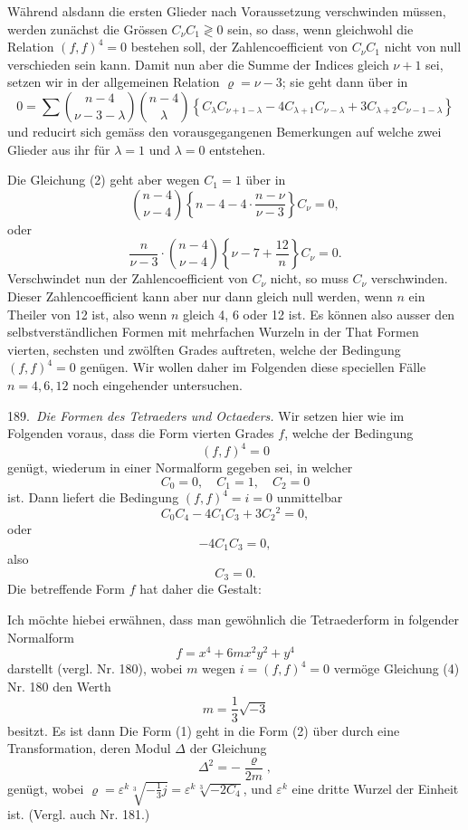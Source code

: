 Während alsdann die ersten Glieder nach Voraussetzung verschwinden
müssen, werden zunächst die Grössen $C_\nu C_1 \gtrless 0$ sein, so dass, wenn
gleichwohl die Relation $(f,f)^4=0$ bestehen soll, der Zahlencoefficient
von $C_\nu C_1$ nicht von null verschieden sein kann. Damit nun aber die
Summe der Indices gleich $\nu+1$ sei, setzen wir in der allgemeinen
Relation $\varrho=\nu-3$; sie geht dann über in
\[
0=\sum\binom{n-4}{\nu-3-\lambda}\binom{n-4}{\lambda}\left\{C_\lambda C_{\nu+1-\lambda}-4C_{\lambda+1}C_{\nu-\lambda}+3C_{\lambda+2}C_{\nu-1-\lambda}\right\}
\]
und reducirt sich gemäss den vorausgegangenen Bemerkungen auf
welche zwei Glieder aus ihr für $\lambda=1$ und $\lambda=0$ entstehen.

Die Gleichung (2) geht aber wegen $C_1=1$ über in
\[
\binom{n-4}{\nu-4}\left\{n-4-4\cdot\frac{n-\nu}{\nu-3}\right\}C_\nu=0,
\]
oder
\[
\frac{n}{\nu-3}\cdot\binom{n-4}{\nu-4}\left\{\nu-7+\frac{12}{n}\right\}C_\nu=0.
\]
Verschwindet nun der Zahlencoefficient von $C_\nu$ nicht, so muss
$C_\nu$ verschwinden. Dieser Zahlencoefficient kann aber nur dann gleich
null werden, wenn $n$ ein Theiler von 12 ist, also wenn $n$ gleich 4,
6 oder 12 ist. Es können also ausser den selbstverständlichen Formen
mit mehrfachen Wurzeln in der That Formen vierten, sechsten und
zwölften Grades auftreten, welche der Bedingung $(f,f)^4=0$ genügen.
Wir wollen daher im Folgenden diese speciellen Fälle $n=4, 6, 12$
noch eingehender untersuchen.

189.\ \textit{Die Formen des Tetraeders und Octaeders.} Wir setzen hier
wie im Folgenden voraus, dass die Form vierten Grades $f$, welche
der Bedingung
\[
(f,f)^4=0
\]
genügt, wiederum in einer Normalform gegeben sei, in welcher
\[
C_0=0,\quad C_1=1,\quad C_2=0
\]
ist. Dann liefert die Bedingung $(f,f)^4=i=0$ unmittelbar
\[
C_0C_4-4C_1C_3+3C_2{}^2=0,
\]
oder
\[
-4C_1C_3=0,
\]
also
\[
C_3=0.
\]
Die betreffende Form $f$ hat daher die Gestalt:


Ich möchte hiebei erwähnen, dass man gewöhnlich die Tetraederform
 in folgender Normalform
\[
f=x^4+6mx^2y^2+y^4
\]
darstellt (vergl. Nr. 180), wobei $m$ wegen $i=(f,f)^4=0$ vermöge
Gleichung (4) Nr. 180 den Werth
\[
m=\frac{1}{3}\sqrt{-3}
\]
besitzt. Es ist dann
Die Form (1) geht in die Form (2) über durch eine Transformation,
deren Modul $\varDelta$ der Gleichung
\[
\varDelta^2=-\frac{\varrho}{2m},
\]
genügt, wobei $\varrho=\varepsilon^k\sqrt[3]{-\frac{1}{3}j}=\varepsilon^k\sqrt[3]{-2C_4}$, und $\varepsilon^k$ eine dritte Wurzel
der Einheit ist. (Vergl. auch Nr. 181.)

